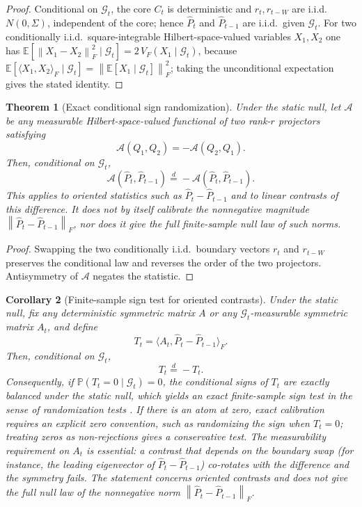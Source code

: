 \documentclass[11pt]{article}
\theoremstyle{tightplain}
\newtheorem{theorem}{Theorem}[section]
\newtheorem{corollary}[theorem]{Corollary}
\theoremstyle{tightdef}
\newcommand{\E}{\mathbb E}
\newcommand{\Prob}{\mathbb P}
\newcommand{\norm}[1]{\left\lVert #1 \right\rVert}
\begin{document}
\begin{proof}
Conditional on $\mathcal G_t$, the core $C_t$ is deterministic and
$r_t,r_{t-W}$ are i.i.d.\ $N(0,\Sigma)$, independent of the core; hence
$\widehat P_t$ and $\widehat P_{t-1}$ are i.i.d.\ given $\mathcal G_t$. For two
conditionally i.i.d.\ square-integrable Hilbert-space-valued variables
$X_1,X_2$ one has
$\E[\norm{X_1-X_2}_F^2\mid\mathcal G_t]=2\,V_F(X_1\mid\mathcal G_t)$, because
$\E[\langle X_1,X_2\rangle_F\mid\mathcal G_t]=\norm{\E[X_1\mid\mathcal G_t]}_F^2$;
taking the unconditional expectation gives the stated identity.
\end{proof}

\begin{theorem}[Exact conditional sign randomization]\label{thm:exactrandomization}
Under the static null, let $\mathcal A$ be any measurable Hilbert-space-valued
functional of two rank-$r$ projectors satisfying
\[
\mathcal A(Q_1,Q_2)=-\mathcal A(Q_2,Q_1).
\]
Then, conditional on $\mathcal G_t$,
\[
\mathcal A(\widehat P_t,\widehat P_{t-1})
\stackrel{d}=
-\mathcal A(\widehat P_t,\widehat P_{t-1}).
\]
This applies to oriented statistics such as $\widehat P_t-\widehat P_{t-1}$ and
to linear contrasts of this difference. It does not by itself calibrate the
nonnegative magnitude $\norm{\widehat P_t-\widehat P_{t-1}}_F$, nor does it give
the full finite-sample null law of such norms.
\end{theorem}

\begin{proof}
Swapping the two conditionally i.i.d.\ boundary vectors $r_t$ and $r_{t-W}$
preserves the conditional law and reverses the order of the two projectors.
Antisymmetry of $\mathcal A$ negates the statistic.
\end{proof}

\begin{corollary}[Finite-sample sign test for oriented contrasts]\label{cor:signtest}
Under the static null, fix any deterministic symmetric matrix $A$ or any
$\mathcal G_t$-measurable symmetric matrix $A_t$, and define
\[
T_t=\langle A_t,\widehat P_t-\widehat P_{t-1}\rangle_F.
\]
Then, conditional on $\mathcal G_t$,
\[
T_t\stackrel d=-T_t.
\]
Consequently, if $\Prob(T_t=0\mid\mathcal G_t)=0$, the conditional signs of
$T_t$ are exactly balanced under the static null, which yields an exact
finite-sample sign test in the sense of randomization tests
\cite[Ch.~15]{LehmannRomano2005}. If there is an atom at zero, exact
calibration requires an explicit zero convention, such as randomizing the sign
when $T_t=0$; treating zeros as non-rejections gives a conservative test. The
measurability requirement on $A_t$ is essential: a contrast that depends on the
boundary swap (for instance, the leading eigenvector of
$\widehat P_t-\widehat P_{t-1}$) co-rotates with the difference and the symmetry
fails. The statement concerns oriented contrasts and does not give the full
null law of the nonnegative norm $\norm{\widehat P_t-\widehat P_{t-1}}_F$.
\end{corollary}
\end{document}
